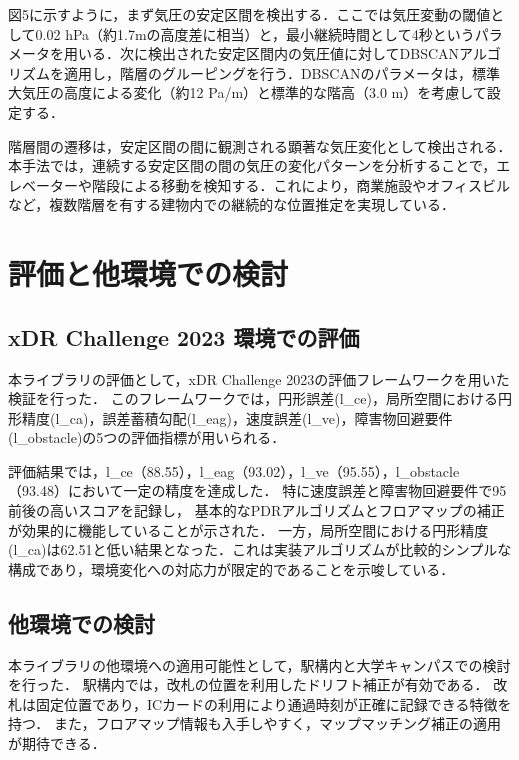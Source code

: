 \documentclass[a4paper, 10pt, twocolumn]{jarticle}
\begin{document}
図5に示すように，まず気圧の安定区間を検出する．ここでは気圧変動の閾値として0.02 hPa（約1.7mの高度差に相当）と，最小継続時間として4秒というパラメータを用いる．次に検出された安定区間内の気圧値に対してDBSCANアルゴリズムを適用し，階層のグルーピングを行う．DBSCANのパラメータは，標準大気圧の高度による変化（約12 Pa/m）と標準的な階高（3.0 m）を考慮して設定する．

階層間の遷移は，安定区間の間に観測される顕著な気圧変化として検出される．本手法では，連続する安定区間の間の気圧の変化パターンを分析することで，エレベーターや階段による移動を検知する．これにより，商業施設やオフィスビルなど，複数階層を有する建物内での継続的な位置推定を実現している．


\section{評価と他環境での検討}









\subsection{xDR Challenge 2023 環境での評価}

本ライブラリの評価として，xDR Challenge 2023の評価フレームワークを用いた検証を行った．
このフレームワークでは，円形誤差(l\_ce)，局所空間における円形精度(l\_ca)，誤差蓄積勾配(l\_eag)，速度誤差(l\_ve)，障害物回避要件(l\_obstacle)の5つの評価指標が用いられる．

評価結果では，l\_ce（88.55），l\_eag（93.02），l\_ve（95.55），l\_obstacle（93.48）において一定の精度を達成した．
特に速度誤差と障害物回避要件で95前後の高いスコアを記録し，
基本的なPDRアルゴリズムとフロアマップの補正が効果的に機能していることが示された．
一方，局所空間における円形精度(l\_ca)は62.51と低い結果となった．これは実装アルゴリズムが比較的シンプルな構成であり，環境変化への対応力が限定的であることを示唆している．



\subsection{他環境での検討}

本ライブラリの他環境への適用可能性として，駅構内と大学キャンパスでの検討を行った．
駅構内では，改札の位置を利用したドリフト補正が有効である．
改札は固定位置であり，ICカードの利用により通過時刻が正確に記録できる特徴を持つ．
また，フロアマップ情報も入手しやすく，マップマッチング補正の適用が期待できる．
\end{document}
